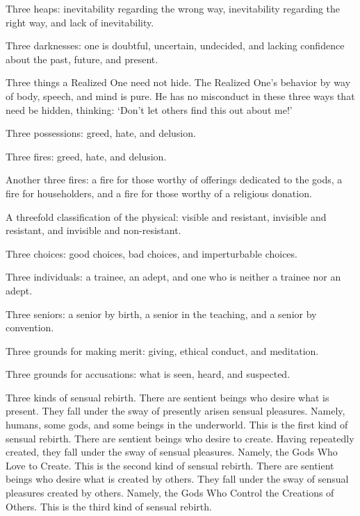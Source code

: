 \documentclass[12pt,openany]{book}%
\begin{document}
Three heaps: inevitability regarding the wrong way, inevitability regarding the right way, and lack of inevitability. 

Three darknesses: one is doubtful, uncertain, undecided, and lacking confidence about the past, future, and present. 

Three things a Realized One need not hide. The Realized One’s behavior by way of body, speech, and mind is pure. He has no misconduct in these three ways that need be hidden, thinking: ‘Don’t let others find this out about me!’ 

Three possessions: greed, hate, and delusion. 

Three fires: greed, hate, and delusion. 

Another three fires: a fire for those worthy of offerings dedicated to the gods, a fire for householders, and a fire for those worthy of a religious donation. 

A threefold classification of the physical: visible and resistant, invisible and resistant, and invisible and non-resistant. 

Three choices: good choices, bad choices, and imperturbable choices. 

Three individuals: a trainee, an adept, and one who is neither a trainee nor an adept. 

Three seniors: a senior by birth, a senior in the teaching, and a senior by convention. 

Three grounds for making merit: giving, ethical conduct, and meditation. 

Three grounds for accusations: what is seen, heard, and suspected. 

Three kinds of sensual rebirth. There are sentient beings who desire what is present. They fall under the sway of presently arisen sensual pleasures. Namely, humans, some gods, and some beings in the underworld. This is the first kind of sensual rebirth. There are sentient beings who desire to create. Having repeatedly created, they fall under the sway of sensual pleasures. Namely, the Gods Who Love to Create. This is the second kind of sensual rebirth. There are sentient beings who desire what is created by others. They fall under the sway of sensual pleasures created by others. Namely, the Gods Who Control the Creations of Others. This is the third kind of sensual rebirth. 
\end{document}
